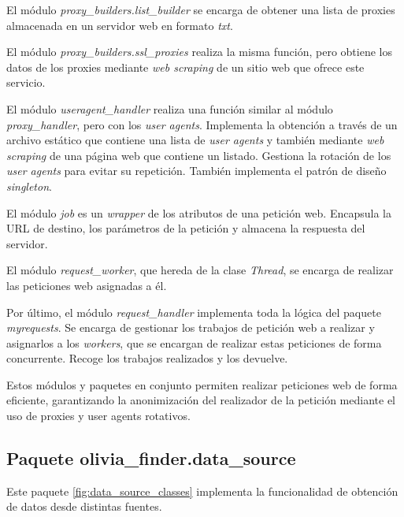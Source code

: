 El módulo \textit{proxy\_builders.list\_builder} se encarga de obtener una lista de proxies almacenada en un
servidor web en formato \textit{txt}.

El módulo \textit{proxy\_builders.ssl\_proxies} realiza la misma función, pero obtiene los datos de los
proxies mediante \textit{web scraping} de un sitio web que ofrece este servicio.

El módulo \textit{useragent\_handler} realiza una función similar al
módulo \textit{proxy\_handler}, pero con los \textit{user agents}. Implementa la obtención a
través de un archivo estático que contiene una lista de \textit{user agents} y también mediante \textit{web scraping} de una página web que contiene un listado. Gestiona la rotación de los \textit{user agents} para evitar su repetición. También implementa el patrón de diseño \textit{singleton}.

El módulo \textit{job} es un \textit{wrapper} de los atributos de una petición web.
Encapsula la URL de destino, los parámetros de la petición y almacena la respuesta del servidor.

El módulo \textit{request\_worker}, que hereda de la clase \textit{Thread}, se encarga de
realizar las peticiones web asignadas a él.

Por último, el módulo \textit{request\_handler} implementa toda la lógica del
paquete \textit{myrequests}. Se encarga de gestionar los trabajos de petición web a realizar y
asignarlos a los \textit{workers}, que se encargan de realizar estas peticiones de forma concurrente.
Recoge los trabajos realizados y los devuelve.

Estos módulos y paquetes en conjunto permiten realizar peticiones web de forma eficiente,
garantizando la anonimización del realizador de la petición mediante el uso de proxies y user
agents rotativos.

\subsection{Paquete olivia\_finder.data\_source}

Este paquete \ref{fig:data_source_classes} implementa la funcionalidad de obtención de datos desde distintas fuentes.

